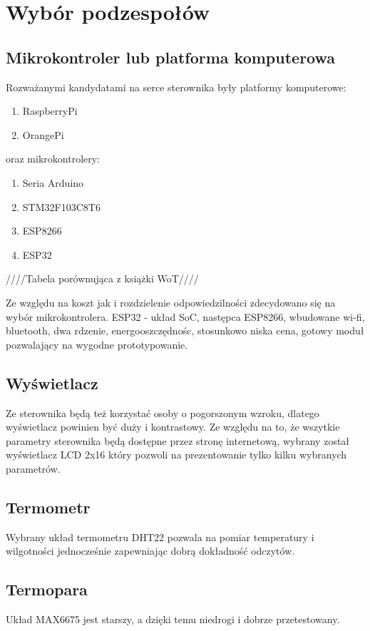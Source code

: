 \documentclass[12pt]{report}
\begin{document}
 
 \chapter{Wybór podzespołów}
 \section{Mikrokontroler lub platforma komputerowa}
 Rozważanymi kandydatami na serce sterownika były platformy komputerowe:
 \begin{enumerate}
 \item RaspberryPi
 \item OrangePi
 \end{enumerate}
 oraz mikrokontrolery:
 \begin{enumerate}
 \item Seria Arduino
 \item STM32F103C8T6
 \item ESP8266
 \item ESP32
 \end{enumerate}
 
 ////Tabela porównująca z książki WoT////
 
 Ze względu na koszt jak i rozdzielenie odpowiedzilności zdecydowano się na wybór mikrokontrolera.
 ESP32 - układ SoC, następca ESP8266, wbudowane wi-fi, bluetooth, dwa rdzenie, energooszczędnośc, stosunkowo niska cena, gotowy moduł pozwalający na wygodne prototypowanie.
 
 \section{Wyświetlacz}
 Ze sterownika będą też korzystać osoby o pogorszonym wzroku, dlatego wyświetlacz powinien być duży i kontrastowy.
 Ze względu na to, że wszytkie parametry sterownika będą dostępne przez stronę internetową, wybrany został wyświetlacz LCD 2x16 który pozwoli na prezentowanie tylko kilku wybranych parametrów.
 
 \section{Termometr}
 Wybrany układ termometru DHT22 pozwala na pomiar temperatury i wilgotności jednocześnie zapewniając dobrą dokładność odczytów.
 
 \section{Termopara}
 Układ MAX6675 jest starszy, a dzięki temu niedrogi i dobrze przetestowany. 
\end{document}
